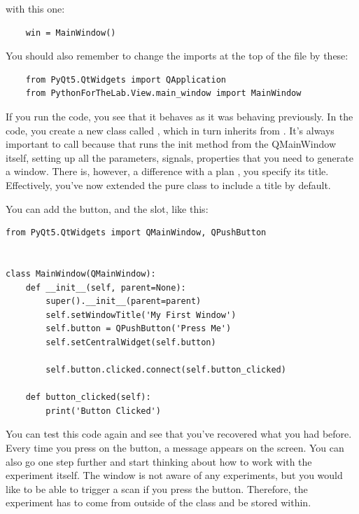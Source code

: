 with this one:

\begin{verbatim}
    win = MainWindow()
\end{verbatim}

You should also remember to change the imports at the top of the file by these:

\begin{verbatim}
    from PyQt5.QtWidgets import QApplication
    from PythonForTheLab.View.main_window import MainWindow
\end{verbatim}

If you run the code, you see that it behaves as it was behaving previously. In the code, you create a new class called , which in turn inherits from . It's always important to call  because that runs the init method from the QMainWindow itself, setting up all the parameters, signals, properties that you need to generate a window. There is, however, a difference with a plan , you specify its title. Effectively, you've now extended the pure  class to include a title by default.


You can add the button, and the slot, like this:

\begin{verbatim}
from PyQt5.QtWidgets import QMainWindow, QPushButton


class MainWindow(QMainWindow):
    def __init__(self, parent=None):
        super().__init__(parent=parent)
        self.setWindowTitle('My First Window')
        self.button = QPushButton('Press Me')
        self.setCentralWidget(self.button)

        self.button.clicked.connect(self.button_clicked)

    def button_clicked(self):
        print('Button Clicked')
\end{verbatim}

You can test this code again and see that you've recovered what you had before. Every time you press on the button, a message appears on the screen. You can also go one step further and start thinking about how to work with the experiment itself. The window is not aware of any experiments, but you would like to be able to trigger a scan if you press the button. Therefore, the experiment has to come from outside of the class and be stored within.

